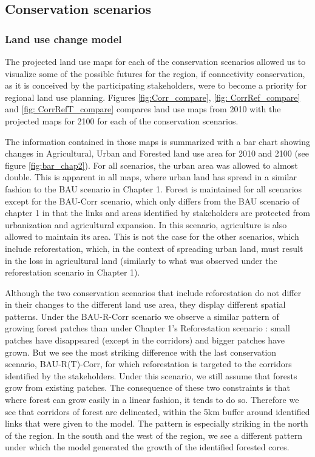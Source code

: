 \subsection{Conservation scenarios}

\subsubsection{Land use change model}

The projected land use maps for each of the conservation scenarios allowed us to visualize some of the possible futures for the region, if connectivity conservation, as it is conceived by the participating stakeholders, were to become a priority for regional land use planning. Figures \ref{fig:Corr_compare}, \ref{fig: CorrRef_compare} and \ref{fig: CorrRefT_compare} compares land use maps from 2010 with the projected maps for 2100 for each of the conservation scenarios.

The information contained in those maps is summarized with a bar chart showing changes in Agricultural, Urban and Forested land use area for 2010 and 2100 (see figure \ref{fig:bar_chap2}). For all scenarios, the urban area was allowed to almost double. This is apparent in all maps, where urban land has spread in a similar fashion to the BAU scenario in Chapter 1. Forest is maintained for all scenarios except for the BAU-Corr scenario, which only differs from the BAU scenario of chapter 1 in that the links and areas identified by stakeholders are protected from urbanization and agricultural expansion. In this scenario, agriculture is also allowed to maintain its area. This is not the case for the other scenarios, which include reforestation, which, in the context of spreading urban land, must result in the loss in agricultural land (similarly to what was observed under the reforestation scenario in Chapter 1).

Although the two conservation scenarios that include reforestation do not differ in their changes to the different land use area, they display different spatial patterns. Under the BAU-R-Corr scenario we observe a similar pattern of growing forest patches than under Chapter 1's Reforestation scenario : small patches have disappeared (except in the corridors) and bigger patches have grown. But we see the most striking difference with the last conservation scenario, BAU-R(T)-Corr, for which reforestation is targeted to the corridors identified by the stakeholders. Under this scenario, we still assume that forests grow from existing patches. The consequence of these two constraints is that where forest can grow easily in a linear fashion, it tends to do so. Therefore we see that corridors of forest are delineated, within the 5km buffer around identified links that were given to the model. The pattern is especially striking in the north of the region. In the south and the west of the region, we see a different pattern under which the model generated the growth of the identified forested cores. \\

